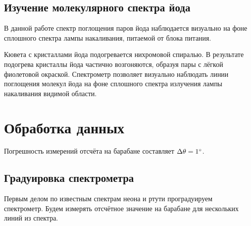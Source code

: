 \documentclass[a4paper,12pt]{article}
\begin{document}
\subsection{Изучение молекулярного спектра йода}
В данной работе спектр поглощения паров йода наблюдается визуально на фоне сплошного спектра лампы накаливания, питаемой от блока питания.

Кювета с кристаллами йода подогревается нихромовой спиралью. В результате подогрева кристаллы йода частично возгоняются, образуя пары с лёгкой фиолетовой окраской. Спектрометр позволяет визуально наблюдать линии поглощения молекул йода на фоне сплошного спектра излучения лампы накаливания видимой области.      

\section{Обработка данных}
Погрешность измерений отсчёта на барабане составляет $\Delta\theta = 1\degree$.
\subsection{Градуировка спектрометра}
Первым делом по известным спектрам неона и ртути проградуируем спектрометр. Будем измерять отсчётное значение на барабане для нескольких линий из спектра.
\end{document}
